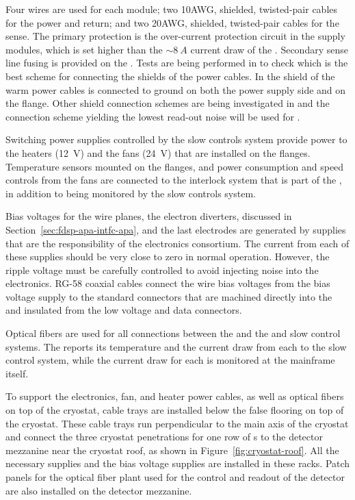 Four wires are used for each  module; two 10AWG, shielded, twisted-pair 
cables for the power and return; and two 20AWG, shielded, twisted-pair 
cables for the sense. The primary protection is the over-current 
protection circuit in the  supply modules, which is set 
higher than the $\sim\SI{8}{A}$ current draw of the . 
Secondary sense line fusing is provided on the .  
Tests are being performed in  to check which is the
best scheme for connecting the shields of the power cables. In
 the shield of the warm power cables is connected to
ground on both the power supply side and on the  flange.
Other shield connection schemes are being investigated in 
and the connection scheme yielding the lowest read-out noise will be
used for .

Switching power supplies controlled by the slow controls system provide
power to the heaters (\SI{12}{V}) and the fans (\SI{24}{V}) that are 
installed on the  flanges. Temperature sensors mounted on the
flanges, and power consumption and speed controls from the fans are 
connected to the interlock system that is part of the , in
addition to being monitored by the slow controls system.

Bias voltages for the  wire planes, the electron diverters,
discussed in Section~\ref{sec:fdsp-apa-intfc-apa}, 
and the last  electrodes are generated by supplies that are 
the responsibility of the  electronics consortium.  The 
current from each of these supplies should be very close to zero in 
normal operation. However, the ripple voltage must be carefully 
controlled to avoid injecting noise into the  electronics.  
RG-58 coaxial cables connect the wire bias voltages from the bias voltage
supply to the standard  connectors that are machined directly 
into the  \fdth and insulated from the low voltage and 
data connectors.

Optical fibers are used for all connections between the  %
and the  and slow 
control systems.  The  reports its temperature 
and the current draw from each  to the slow control system, 
while the current draw for each  is monitored at the 
mainframe itself.

To support the electronics, fan, and heater power cables, as well 
as optical fibers on top of the cryostat, cable trays are installed
below the false flooring on top of the cryostat. These cable trays
run perpendicular to the main axis of the cryostat and connect the
three cryostat penetrations for one row of s to the detector
mezzanine near the cryostat roof, as shown in Figure~\ref{fig:cryostat-roof}.
All the necessary  supplies and %
the bias
voltage supplies are installed in these racks. Patch panels for
the optical fiber plant used for the control and readout of the
detector are also installed on the detector mezzanine.

